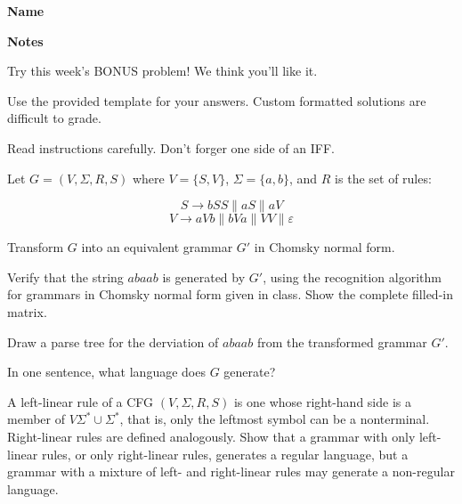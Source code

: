 \documentclass[letterpaper, ps]{cs121}
\begin{document}




\vspace{3mm}
\begin{center} \bf{Name} \end{center}


\vspace{3mm}
\begin{center} \bf{Notes} \end{center}

\noindent
Try this week's BONUS problem! We think you'll like it.

\noindent
Use the provided template for your answers. Custom formatted solutions are difficult to grade.

\noindent
Read instructions carefully. Don't forger one side of an IFF.


Let $G = (V, \Sigma, R, S)$ where $V=\{S,V\}$, $\Sigma = \{a,b\}$, and $R$ is the set of rules: 

$$ 
S \rightarrow bSS \| aS \| aV $$
$$ V \rightarrow aVb \| bVa \| VV \| \varepsilon 
$$

\subproblem
Transform $G$ into an equivalent grammar $G'$ in Chomsky normal form.

\subproblem
Verify that the string $abaab$ is generated by $G'$, using the recognition algorithm for grammars in Chomsky normal form given in class.  Show the complete filled-in matrix.

\subproblem
Draw a parse tree for the derviation of $abaab$ from the transformed grammar $G'$.

\subproblem 
In one sentence, what language does $G$ generate?



A left-linear rule of a CFG $(V, \Sigma, R, S)$ is one whose right-hand side is a member of $V\Sigma^*\cup\Sigma^*$, that is, only the leftmost symbol can be a nonterminal. Right-linear rules are defined analogously. Show that a grammar with only left-linear rules, or only right-linear rules, generates a regular language, but a grammar with a mixture of left- and right-linear rules may generate a non-regular language.
\end{document}
